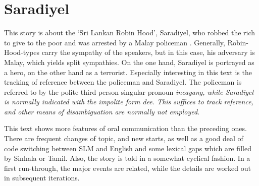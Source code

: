 \section*{Saradiyel}
This story is about the `Sri Lankan Robin Hood', Saradiyel, who robbed the rich to give to the poor and was arrested by a Malay policeman \citep[cf.][52]{OsmanEtAl2008}. Generally, Robin-Hood-types carry the sympathy of the speakers, but in this case, his adversary is Malay, which yields split sympathies. On the one hand, Saradiyel is portrayed as a hero, on the other hand as a terrorist. Especially interesting in this text is the tracking of reference between the policeman and Saradiyel. The policeman is referred to by the polite third person singular pronoun \em incayang\em, while Saradiyel is normally indicated with the impolite form \em dee\em. This suffices to track reference, and other means of disambiguation are normally not employed.

This text shows more features of oral communication than the preceding ones. There are frequent changes of topic, and new starts, as well as a good deal of code switching between SLM and English and some lexical gaps which are filled by Sinhala or Tamil.
Also, the story is told in a somewhat cyclical fashion. In a first run-through, the major events are related, while the details are worked out in subsequent iterations.


\glossSTDmode
{}



 

\addtocounter{footnote}{-1}
\addtocounter{footnote}{1}

